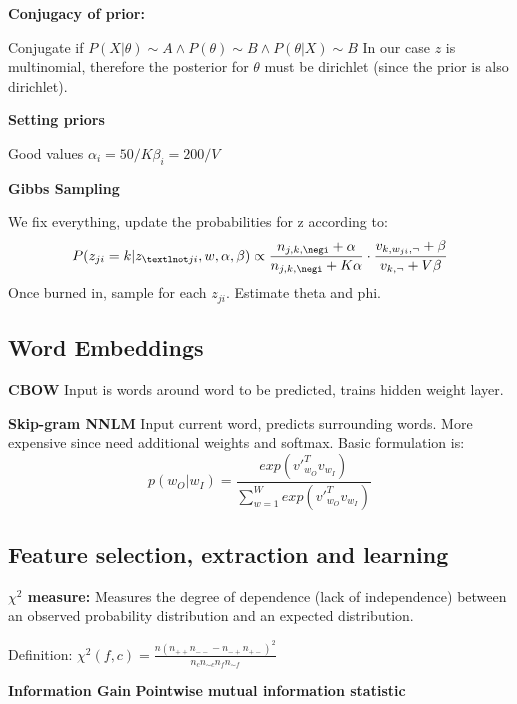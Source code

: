 \documentclass[a4paper,10pt,landscape]{article}
\newcommand{\topic}[1]{\begin{center}\section*{#1}\end{center}}
\begin{document}
\begin{multicols}{3}
\textbf{Conjugacy of prior:}

Conjugate if $P(X|\theta) \sim A \land P(\theta) \sim B \land P(\theta|X)\sim B$
In our case $z$  is multinomial, therefore the posterior for $\theta$ must be dirichlet (since the prior is also dirichlet).

\textbf{Setting priors}

Good values $\alpha_i = 50/K \beta_i=200/V$

\textbf{Gibbs Sampling}

We fix everything, update the probabilities for z according to:
\begin{equation*}
    P(z_{ji}=k|z_{¬ji},w,\alpha,\beta)\propto \frac{n_{j,k,\negi}+\alpha}{n_{j,k,\negi}+K\alpha}\cdot\frac{v_{k,w_{ji},\neg}+\beta}{v_{k,\neg}+V\beta}
\end{equation*}
Once burned in, sample for each $z_{ji}$. Estimate theta and phi.
\topic{Word Embeddings}
\textbf{CBOW}
Input is words around word to be predicted, trains hidden weight layer.

\textbf{Skip-gram NNLM}
Input current word, predicts surrounding words.
More expensive since need additional weights and softmax.
Basic formulation is:
\begin{equation*}
    p(w_O|w_I) = \frac{exp(v'_{w_O}^Tv_{w_I})}{\sum_{w=1}^{W}exp(v'_{w_O}^Tv_{w_I})}
\end{equation*}
\topic{Feature selection, extraction and learning}
\textbf{$\chi^2$ measure:} Measures the degree of dependence (lack of independence) between an observed probability distribution and an expected distribution.

Definition: $\chi^2(f,c)=\frac{n(n_{++}n_{--}-n_{-+}n_{+-})^2}{n_{c}n_{\sim c}n_{f}n_{\sim f}}$

\textbf{Information Gain}
\textbf{Pointwise mutual information statistic}
\newpage
\end{multicols}
\end{document}
